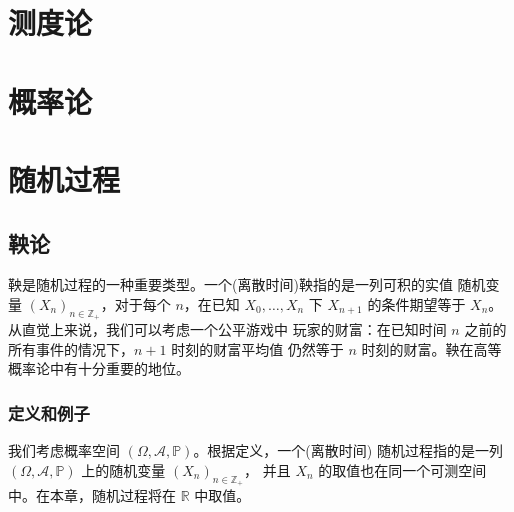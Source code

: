 \documentclass[fontset=none]{Notes}
\begin{document}
\frontmatter

\tableofcontents

\mainmatter


\part{测度论}











\part{概率论}









\part{随机过程}

\chapter{鞅论}

鞅是随机过程的一种重要类型。一个(离散时间)鞅指的是一列可积的实值
随机变量 $(X_n)_{n\in \mathbb{Z}_+}$，对于每个 $n$，在已知 $X_0,\dots,X_n$
下 $X_{n+1}$ 的条件期望等于 $X_n$。从直觉上来说，我们可以考虑一个公平游戏中
玩家的财富：在已知时间 $n$ 之前的所有事件的情况下，$n+1$ 时刻的财富平均值
仍然等于 $n$ 时刻的财富。鞅在高等概率论中有十分重要的地位。

\section{定义和例子}

我们考虑概率空间 $(\Omega,\mathcal{A},\mathbb{P})$。根据定义，一个(离散时间)
随机过程指的是一列 $(\Omega,\mathcal{A},\mathbb{P})$ 上的随机变量 $(X_n)_{n\in \mathbb{Z}_+}$，
并且 $X_n$ 的取值也在同一个可测空间中。在本章，随机过程将在 $\mathbb{R}$ 中取值。
\end{document}
